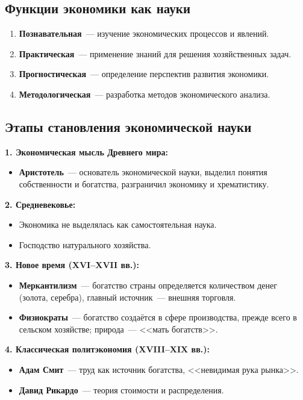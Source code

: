 \documentclass[12pt]{article}
\begin{document}
	\subsection{Функции экономики как науки}
	\begin{enumerate}
		\item \textbf{Познавательная}~--- изучение экономических процессов и явлений.
		\item \textbf{Практическая}~--- применение знаний для решения хозяйственных задач.
		\item \textbf{Прогностическая}~--- определение перспектив развития экономики.
		\item \textbf{Методологическая}~--- разработка методов экономического анализа.
	\end{enumerate}
	
	\subsection{Этапы становления экономической науки}
	
	\textbf{1. Экономическая мысль Древнего мира:}
	\begin{itemize}
		\item \textbf{Аристотель}~--- основатель экономической науки, выделил понятия собственности и богатства, разграничил экономику и хрематистику.
	\end{itemize}
	
	\noindent \textbf{2. Средневековье:}
	\begin{itemize}
		\item Экономика не выделялась как самостоятельная наука.
		\item Господство натурального хозяйства.
	\end{itemize}
	
	\noindent \textbf{3. Новое время (XVI--XVII вв.):}
	\begin{itemize}
		\item \textbf{Меркантилизм}~--- богатство страны определяется количеством денег (золота, серебра), главный источник~--- внешняя торговля.
		\item \textbf{Физиократы}~--- богатство создаётся в сфере производства, прежде всего в сельском хозяйстве; природа~--- <<мать богатств>>.
	\end{itemize}
	
	\noindent \textbf{4. Классическая политэкономия (XVIII--XIX вв.):}
	\begin{itemize}
		\item \textbf{Адам Смит}~--- труд как источник богатства, <<невидимая рука рынка>>.
		\item \textbf{Давид Рикардо}~--- теория стоимости и распределения.
	\end{itemize}
	
\end{document}
